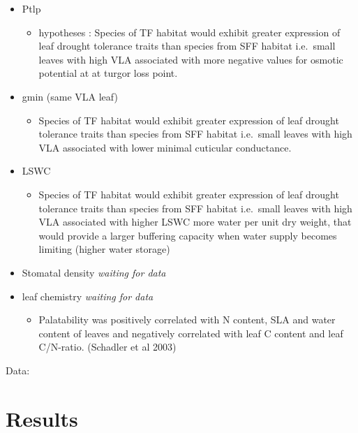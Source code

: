 \documentclass[
]{book}
\providecommand{\tightlist}{%
  \setlength{\itemsep}{0pt}\setlength{\parskip}{0pt}}
\begin{document}
\begin{itemize}
\tightlist
\item
  Ptlp

  \begin{itemize}
  \tightlist
  \item
    hypotheses : Species of TF habitat would exhibit greater expression of leaf drought tolerance traits than species from SFF habitat i.e.~small leaves with high VLA associated with more negative values for osmotic potential at at turgor loss point.
  \end{itemize}
\item
  gmin (same VLA leaf)

  \begin{itemize}
  \tightlist
  \item
    Species of TF habitat would exhibit greater expression of leaf drought tolerance traits than species from SFF habitat i.e.~small leaves with high VLA associated with lower minimal cuticular conductance.
  \end{itemize}
\item
  LSWC

  \begin{itemize}
  \tightlist
  \item
    Species of TF habitat would exhibit greater expression of leaf drought tolerance traits than species from SFF habitat i.e.~small leaves with high VLA associated with higher LSWC more water per unit dry weight, that would provide a larger buffering capacity when water supply becomes limiting (higher water storage)
  \end{itemize}
\item
  Stomatal density \emph{waiting for data}
\item
  leaf chemistry \emph{waiting for data}

  \begin{itemize}
  \tightlist
  \item
    Palatability was positively correlated with N content, SLA and water content of leaves and negatively correlated with leaf C content and leaf C/N-ratio. (Schadler et al 2003)
  \end{itemize}
\end{itemize}

Data:

\hypertarget{results}{%
\section{Results}\label{results}}
\end{document}
